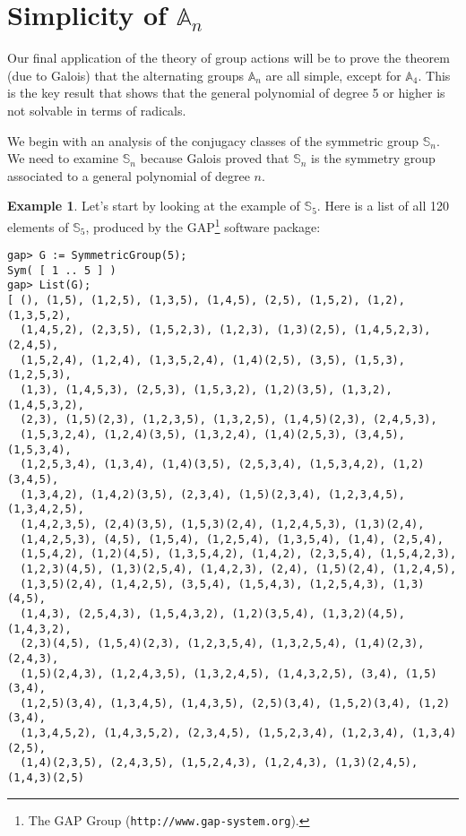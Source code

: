 \documentclass[11pt,oneside]{article}
\theoremstyle{definition}
\newtheorem{example}[thm]{Example}
\newcommand{\Sym}{\mathbb{S}}
\newcommand{\Alt}{\mathbb{A}}
\begin{document}
\newpage
\section{Simplicity of $\Alt_n$}\noindent
Our final application of the theory of group actions will be to prove
the theorem (due to Galois) that the alternating groups $\Alt_n$ are
all simple, except for $\Alt_4$.  This is the key result that shows
that the general polynomial of degree 5 or higher is not solvable in
terms of radicals.

We begin with an analysis of the conjugacy classes of the symmetric
group $\Sym_n$. We need to examine $\Sym_n$ because Galois proved that
$\Sym_n$ is the symmetry group associated to a general polynomial of
degree $n$.


\begin{example} \label{CC:S5}
Let's start by looking at the example of $\Sym_5$. Here is a list of
all 120 elements of $\Sym_5$, produced by the GAP\footnote{The GAP Group
  (\texttt{http://www.gap-system.org}).} software package: \tiny
\begin{verbatim}
gap> G := SymmetricGroup(5);
Sym( [ 1 .. 5 ] )
gap> List(G);
[ (), (1,5), (1,2,5), (1,3,5), (1,4,5), (2,5), (1,5,2), (1,2), (1,3,5,2), 
  (1,4,5,2), (2,3,5), (1,5,2,3), (1,2,3), (1,3)(2,5), (1,4,5,2,3), (2,4,5), 
  (1,5,2,4), (1,2,4), (1,3,5,2,4), (1,4)(2,5), (3,5), (1,5,3), (1,2,5,3), 
  (1,3), (1,4,5,3), (2,5,3), (1,5,3,2), (1,2)(3,5), (1,3,2), (1,4,5,3,2), 
  (2,3), (1,5)(2,3), (1,2,3,5), (1,3,2,5), (1,4,5)(2,3), (2,4,5,3), 
  (1,5,3,2,4), (1,2,4)(3,5), (1,3,2,4), (1,4)(2,5,3), (3,4,5), (1,5,3,4), 
  (1,2,5,3,4), (1,3,4), (1,4)(3,5), (2,5,3,4), (1,5,3,4,2), (1,2)(3,4,5), 
  (1,3,4,2), (1,4,2)(3,5), (2,3,4), (1,5)(2,3,4), (1,2,3,4,5), (1,3,4,2,5), 
  (1,4,2,3,5), (2,4)(3,5), (1,5,3)(2,4), (1,2,4,5,3), (1,3)(2,4), 
  (1,4,2,5,3), (4,5), (1,5,4), (1,2,5,4), (1,3,5,4), (1,4), (2,5,4), 
  (1,5,4,2), (1,2)(4,5), (1,3,5,4,2), (1,4,2), (2,3,5,4), (1,5,4,2,3), 
  (1,2,3)(4,5), (1,3)(2,5,4), (1,4,2,3), (2,4), (1,5)(2,4), (1,2,4,5), 
  (1,3,5)(2,4), (1,4,2,5), (3,5,4), (1,5,4,3), (1,2,5,4,3), (1,3)(4,5), 
  (1,4,3), (2,5,4,3), (1,5,4,3,2), (1,2)(3,5,4), (1,3,2)(4,5), (1,4,3,2), 
  (2,3)(4,5), (1,5,4)(2,3), (1,2,3,5,4), (1,3,2,5,4), (1,4)(2,3), (2,4,3), 
  (1,5)(2,4,3), (1,2,4,3,5), (1,3,2,4,5), (1,4,3,2,5), (3,4), (1,5)(3,4), 
  (1,2,5)(3,4), (1,3,4,5), (1,4,3,5), (2,5)(3,4), (1,5,2)(3,4), (1,2)(3,4), 
  (1,3,4,5,2), (1,4,3,5,2), (2,3,4,5), (1,5,2,3,4), (1,2,3,4), (1,3,4)(2,5), 
  (1,4)(2,3,5), (2,4,3,5), (1,5,2,4,3), (1,2,4,3), (1,3)(2,4,5), (1,4,3)(2,5) 

\end{verbatim}
\end{example}
\end{document}
